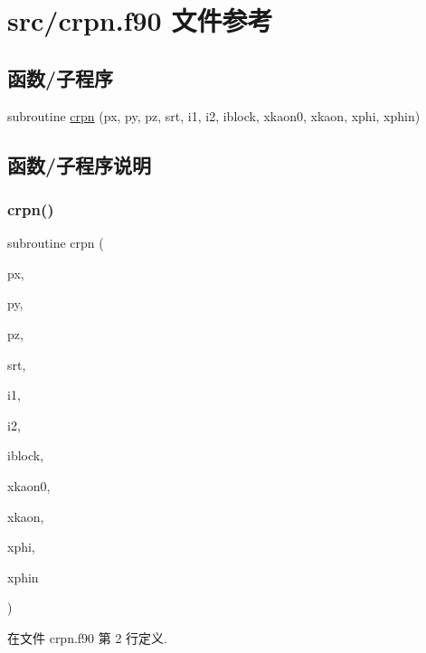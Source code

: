 \hypertarget{crpn_8f90}{}\section{src/crpn.f90 文件参考}
\label{crpn_8f90}
\subsection*{函数/子程序}
\begin{DoxyCompactItemize}
\item 
subroutine \mbox{\hyperlink{crpn_8f90_a9a3f8179163fab432b76e4ee2005c980}{crpn}} (px, py, pz, srt, i1, i2, iblock, xkaon0, xkaon, xphi, xphin)
\end{DoxyCompactItemize}


\subsection{函数/子程序说明}
\mbox{\label{crpn_8f90_a9a3f8179163fab432b76e4ee2005c980}} 
\subsubsection{\texorpdfstring{crpn()}{crpn()}}
{\footnotesize\ttfamily subroutine crpn (\begin{DoxyParamCaption}\item[{}]{px,  }\item[{}]{py,  }\item[{}]{pz,  }\item[{}]{srt,  }\item[{}]{i1,  }\item[{}]{i2,  }\item[{}]{iblock,  }\item[{}]{xkaon0,  }\item[{}]{xkaon,  }\item[{}]{xphi,  }\item[{}]{xphin }\end{DoxyParamCaption})}



在文件 crpn.\+f90 第 2 行定义.

